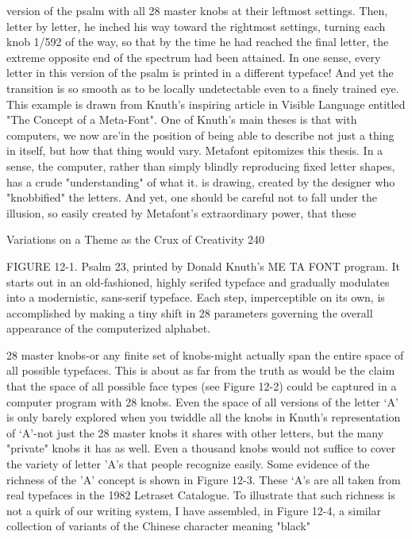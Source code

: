 version of the psalm with all 28 master knobs at their leftmost settings. Then, letter by
letter, he inched his way toward the rightmost settings, turning each knob 1/592 of the
way, so that by the time he had reached the final letter, the extreme opposite end of
the spectrum had been attained. In one sense, every letter in this version of the psalm
is printed in a different typeface! And yet the transition is so smooth as to be locally
undetectable even to a finely trained eye. This example is drawn from Knuth's
inspiring article in Visible Language entitled "The Concept of a Meta-Font".
         One of Knuth's main theses is that with computers, we now are'in the position
of being able to describe not just a thing in itself, but how that thing would vary.
Metafont epitomizes this thesis. In a sense, the computer, rather than simply blindly
reproducing fixed letter shapes, has a crude "understanding" of what it. is drawing,
created by the designer who "knobbified" the letters. And yet, one should be careful
not to fall under the illusion, so easily created by Metafont's extraordinary power, that
these




Variations on a Theme as the Crux of Creativity                                        240

FIGURE 12-1. Psalm 23, printed by Donald Knuth's ME TA FONT program. It starts
out in an old-fashioned, highly serifed typeface and gradually modulates into a
modernistic, sans-serif typeface. Each step, imperceptible on its own, is accomplished
by making a tiny shift in 28 parameters governing the overall appearance of the
computerized alphabet.

28 master knobs-or any finite set of knobs-might actually span the entire space of all
possible typefaces. This is about as far from the truth as would be the claim that the
space of all possible face types (see Figure 12-2) could be captured in a computer
program with 28 knobs.
         Even the space of all versions of the letter `A' is only barely explored when
you twiddle all the knobs in Knuth's representation of `A'-not just the 28 master knobs
it shares with other letters, but the many "private" knobs it has as well. Even a
thousand knobs would not suffice to cover the variety of letter 'A's that people
recognize easily. Some evidence of the richness of the 'A' concept is shown in Figure
12-3. These `A's are all taken from real typefaces in the 1982 Letraset Catalogue. To
illustrate that such richness is not a quirk of our writing system, I have assembled, in
Figure 12-4, a similar collection of variants of the Chinese character meaning "black"




